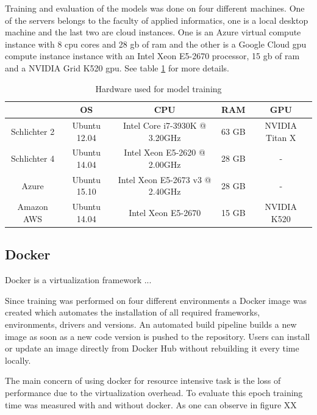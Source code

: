 Training and evaluation of the models was done on four different machines. One of the servers belongs to the faculty of applied informatics, one is a local desktop machine and the last two are cloud instances. One is an Azure virtual compute instance with 8 \gls{cpu} cores and 28 \gls{gb} of \gls{ram} and the other is a Google Cloud \gls{gpu} compute instance instance with an Intel Xeon E5-2670 processor, 15 \gls{gb} of \gls{ram} and a NVIDIA Grid K520 \gls{gpu}. See table \ref{tab:05_usedHardware} for more details.
\begin{table}[hbt]
	\centering
	\caption{Hardware used for model training}
	\label{tab:05_usedHardware}
	\begin{tabular}{@{}ccccc@{}}
		\toprule
		\multicolumn{1}{c}{\textbf{}}    & \multicolumn{1}{c}{\textbf{OS}} & \multicolumn{1}{c}{\textbf{CPU}}                    & \multicolumn{1}{c}{\textbf{RAM}} & \multicolumn{1}{c}{\textbf{GPU}}     \\ \midrule
		Schlichter 2 & Ubuntu 12.04              & Intel Core i7-3930K @ 3.20GHz   & 63 GB        & NVIDIA Titan X \\ \midrule
		Schlichter 4 & Ubuntu 14.04              & Intel Xeon E5-2620 @ 2.00GHz    & 28 GB        & -                \\ \midrule
		Azure        & Ubuntu 15.10              & Intel Xeon E5-2673 v3 @ 2.40GHz & 28 GB        & -                \\ \midrule
		Amazon AWS   & Ubuntu 14.04              & Intel Xeon E5-2670              & 15 GB        & NVIDIA K520 \\ \bottomrule
	\end{tabular}
\end{table}


\subsection{Docker}

Docker is a virtualization framework ...


Since training was performed on four different environments a Docker image was created which automates the installation of all required frameworks, environments, drivers and versions. An automated build pipeline builds a new image as soon as a new code version is pushed to the repository. Users can install or update an image directly from Docker Hub without rebuilding it every time locally.

The main concern of using docker for resource intensive task is the loss of performance due to the virtualization overhead. To evaluate this epoch training time was measured with and without docker. As one can observe in figure XX 




